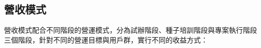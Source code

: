   
  
  
  



\subsection{營收模式} %

營收模式配合不同階段的營運模式，分為試辦階段、種子培訓階段與專案執行階段三個階段，針對不同的營運目標與用戶群，實行不同的收益方式：


